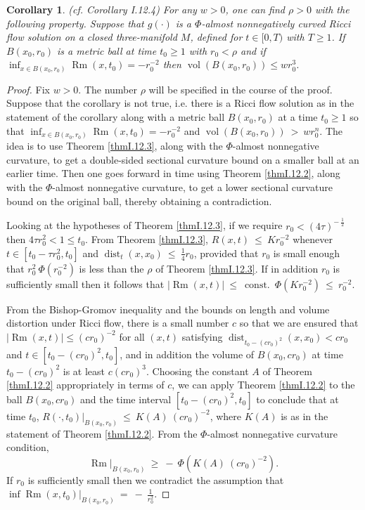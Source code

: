 \documentclass[12pt]{amsart}
\newcommand{\const}{\operatorname{const.}}
\newcommand{\dist}{\operatorname{dist}}
\newcommand{\Rm}{\operatorname{Rm}}
\newcommand{\vol}{\operatorname{vol}}
\numberwithin{equation}{section}
\theoremstyle{plain}
\newtheorem{corollary}[equation]{Corollary}
\theoremstyle{definition}
\theoremstyle{remark}
\begin{document}
\begin{corollary} (cf. Corollary I.12.4) \label{corI.12.4}
For any $w > 0$, one can find $\rho > 0$ with the following property.
Suppose that $g(\cdot)$ is a $\Phi$-almost nonnegatively curved
Ricci flow solution on a closed three-manifold $M$, defined for
$t \in [0, T)$ with $T \ge 1$. If $B(x_0, r_0)$ is a metric ball
at time $t_0 \ge 1$ with $r_0 < \rho$ and if
$\inf_{x \in B(x_0,r_0)}  \Rm(x, t_0)  = - r_0^{-2}$ then
$\vol(B(x_0, r_0)) \le w r_0^3$.
\end{corollary}
\begin{proof}
Fix $w > 0$. 
The number $\rho$ will be specified in the course of the proof.
Suppose that the corollary is not true, i.e. 
there is a Ricci flow solution as in the statement of the corollary along
with a metric ball $B(x_0, r_0)$ at a time $t_0 \ge 1$
so that  $\inf_{x \in B(x_0,r_0)}  \Rm(x, t_0)  = - r_0^{-2}$ 
and $\vol(B(x_0, r_0)) \: > \: w r_0^n$.
The idea is to use
Theorem \ref{thmI.12.3}, along with the $\Phi$-almost nonnegative
curvature, to get a double-sided sectional
curvature bound on a smaller
ball at an earlier time. Then one goes forward in time using 
Theorem \ref{thmI.12.2}, along with the $\Phi$-almost nonnegative
curvature, to get a lower sectional curvature bound on the
original ball, thereby obtaining a contradiction.

Looking at the hypotheses of Theorem \ref{thmI.12.3}, if
we require $r_0 < (4\tau)^{- \: \frac12}$ then
$4 \tau r_0^2 < 1 \le t_0$.
From Theorem \ref{thmI.12.3}, $R(x, t) \: \le \: K r_0^{-2}$
whenever  $t \in [t_0 - \tau r_0^2, t_0]$
and $\dist_t(x, x_0) \: \le \: \frac{1}{4} r_0$, provided that $r_0$ is
small enough that
$r_0^2 \: \Phi(r_0^{-2})$
is less than the $\rho$ of Theorem \ref{thmI.12.3}.
If in addition $r_0$ is sufficiently small then it follows that
$|\Rm(x,t)| \: \le \: \const \: \Phi(K r_0^{-2}) \: \le \: r_0^{-2}$. 

From the Bishop-Gromov inequality and the bounds on length and
volume distortion under Ricci flow, there is a small number $c$ so
that we are ensured that $|\Rm(x,t)| \le (cr_0)^{-2}$ for all $(x,t)$
satisfying $\dist_{t_0 - (cr_0)^2}(x, x_0) < cr_0$ and
$t \in [t_0 - (cr_0)^2, t_0]$, and in addition the volume of
$B(x_0, cr_0)$ at time $t_0 - (cr_0)^2$ is at least
$c(cr_0)^3$. Choosing the constant $A$ of Theorem \ref{thmI.12.2}
appropriately in terms of $c$, we can apply Theorem \ref{thmI.12.2}
to the ball $B(x_0, cr_0)$ and the time interval $[t_0 - (cr_0)^2, t_0]$
to conclude that at time $t_0$,
$R(\cdot, t_0) \Big|_{B(x_0, r_0)} \: \le \: K(A) \:
(cr_0)^{-2}$, where $K(A)$ is as in the statement of
Theorem \ref{thmI.12.2}.
From the $\Phi$-almost nonnegative curvature condition,
\begin{equation}
\Rm \Big|_{B(x_0, r_0)} \: \ge \: - \:
\Phi \left(K(A) \:
(cr_0)^{-2} \right).
\end{equation}
If $r_0$ is sufficiently small then we contradict the assumption that
$\inf \Rm(x, t_0) 
\Big|_{B(x_0,r_0)} \: = \: - \:
\frac{1}{r_0^2}$.
\end{proof}
\end{document}
